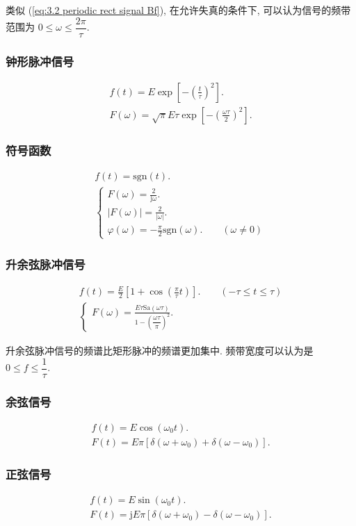 类似 (\ref{eq:3.2 periodic rect signal Bf}), 在允许失真的条件下, 可以认为信号的频带范围为 $0\leq \omega\leq \dfrac{2\pi}{\tau}$.

\subsubsection{钟形脉冲信号}
\rmg
\begin{gather}
    f(t)=E\exp\left[-\left(\frac{t}{\tau}\right)^2\right]. \\
    F(\omega)=\sqrt{\pi}E\tau\exp\left[-\left(\frac{\omega\tau}{2}\right)^2\right].
\end{gather}

\subsubsection{符号函数}
\rmg\srmg
\begin{gather}
    f(t)=\mathrm{sgn}(t). \\
    \begin{cases}
        F(\omega)=\frac{2}{\mathrm{j}\omega}. \\
        |F(\omega)|=\frac{2}{|\omega|}.       \\
        \varphi(\omega)=-\frac{\pi}{2}\mathrm{sgn}(\omega).\qquad (\omega\neq 0)
    \end{cases}
\end{gather}

\subsubsection{升余弦脉冲信号}
\rmg
\begin{gather}
    f(t)=\frac{E}{2}\left[1+\cos\left(\frac{\pi}{\tau}t\right)\right].\qquad (-\tau\leq t\leq \tau) \\
    \begin{cases}
        F(\omega)=\frac{E\tau\mathrm{Sa}(\omega\tau)}{1-\left(\dfrac{\omega\tau}{\pi}\right)^2}.
    \end{cases}
\end{gather}

升余弦脉冲信号的频谱比矩形脉冲的频谱更加集中. 频带宽度可以认为是 $0\leq f\leq \dfrac{1}{\tau}$.

\subsubsection{余弦信号}
\rmg\srmg
\begin{gather}
    f(t)=E\cos(\omega_0 t). \\
    F(t)=E\pi[\delta(\omega+\omega_0)+\delta(\omega-\omega_0)].
\end{gather}

\subsubsection{正弦信号}
\rmg\srmg
\begin{gather}
    f(t)=E\sin(\omega_0 t). \\
    F(t)=\mathrm{j}E\pi[\delta(\omega+\omega_0)-\delta(\omega-\omega_0)].
\end{gather}
